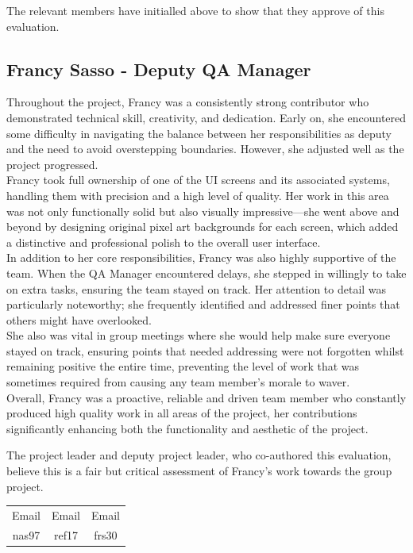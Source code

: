 \documentclass[a4paper]{project}
\begin{document}
			The relevant members have initialled above to show that they approve of this evaluation.
		
		\subsection{Francy Sasso - Deputy QA Manager}\label{subsec:performance-francy-sasso}
		
			Throughout the project, Francy was a consistently strong contributor who demonstrated technical skill, creativity, and dedication. Early on, she encountered some difficulty in navigating the balance between her responsibilities as deputy and the need to avoid overstepping boundaries. However, she adjusted well as the project progressed. \\
			Francy took full ownership of one of the UI screens and its associated systems, handling them with precision and a high level of quality. Her work in this area was not only functionally solid but also visually impressive—she went above and beyond by designing original pixel art backgrounds for each screen, which added a distinctive and professional polish to the overall user interface. \\
			In addition to her core responsibilities, Francy was also highly supportive of the team. When the QA Manager encountered delays, she stepped in willingly to take on extra tasks, ensuring the team stayed on track. Her attention to detail was particularly noteworthy; she frequently identified and addressed finer points that others might have overlooked. \\
			She also was vital in group meetings where she would help make sure everyone stayed on track, ensuring points that needed addressing were not forgotten whilst remaining positive the entire time, preventing the level of work that was sometimes required from causing any team member's morale to waver. \\
			Overall, Francy was a proactive, reliable and driven team member who constantly produced high quality work in all areas of the project, her contributions significantly enhancing both the functionality and aesthetic of the project.
			
			The project leader and deputy project leader, who co-authored this evaluation, believe this is a fair but critical assessment of Francy's work towards the group project.
			
			\begin{center}
				\setlength{\tabcolsep}{0.05\paperwidth}
				\begin{tabular}{c c c}
					Email & Email & Email  \\
					nas97 & ref17 & frs30
				\end{tabular}
			\end{center}
			
\end{document}
